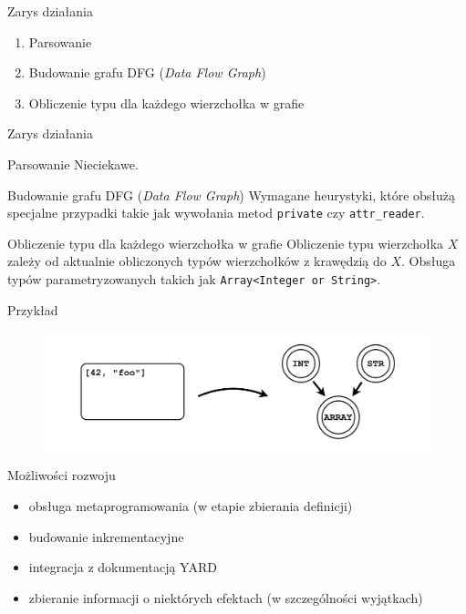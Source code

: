 \documentclass{beamer}
\begin{document}
\begin{frame}{Zarys działania}
 \begin{enumerate}
  \item Parsowanie
  \item Budowanie grafu DFG (\textit{Data Flow Graph})
  \item Obliczenie typu dla każdego wierzchołka w grafie
 \end{enumerate}
\end{frame}

\begin{frame}{Zarys działania}
 \begin{block}{Parsowanie}
  Nieciekawe.
 \end{block}
 \pause
 \begin{block}{Budowanie grafu DFG (\textit{Data Flow Graph})}
  Wymagane heurystyki, które obsłużą specjalne przypadki takie jak wywołania metod \texttt{private} czy \texttt{attr\_reader}.
 \end{block}
 \pause
 \begin{block}{Obliczenie typu dla każdego wierzchołka w grafie}
  Obliczenie typu wierzchołka $X$ zależy od aktualnie obliczonych typów wierzchołków z krawędzią do $X$. Obsługa typów parametryzowanych takich jak \texttt{Array<Integer or String>}.
 \end{block}
\end{frame}

\begin{frame}{Przykład}
  \begin{figure}[htb]
    \centering
    \hspace*{-1cm} \includegraphics[scale=0.6]{msc-array.png}
  \end{figure}
\end{frame}



\begin{frame}{Możliwości rozwoju}
 \begin{itemize}
  \item obsługa metaprogramowania (w etapie zbierania definicji)
  \item budowanie inkrementacyjne
  \item integracja z dokumentacją YARD
  \item zbieranie informacji o niektórych efektach (w szczególności wyjątkach)
 \end{itemize}
\end{frame}
\end{document}
